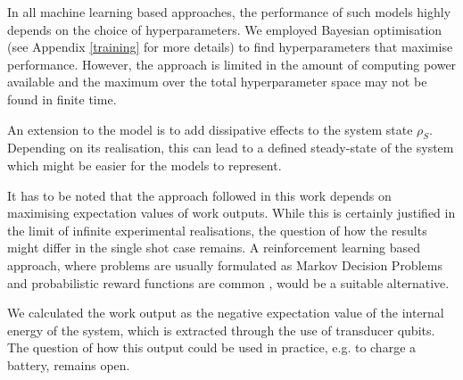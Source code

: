 In all machine learning based approaches, the performance of such models highly depends on the choice of hyperparameters.
We employed Bayesian optimisation (see Appendix \ref{training} for more details) to find hyperparameters that maximise performance.
However, the approach is limited in the amount of computing power available and the maximum over the total hyperparameter space may not be found in finite time.

An extension to the model is to add dissipative effects to the system state $\rho_S$.
Depending on its realisation, this can lead to a defined steady-state of the system which might be easier for the models to represent.

It has to be noted that the approach followed in this work depends on maximising expectation values of work outputs.
While this is certainly justified in the limit of infinite experimental realisations, the question of how the results might differ in the single shot case remains.
A reinforcement learning based approach, where problems are usually formulated as Markov Decision Problems and probabilistic reward functions are common \cite{Sutton1998}, would be a suitable alternative.

We calculated the work output as the negative expectation value of the internal energy of the system, which is extracted through the use of transducer qubits.
The question of how this output could be used in practice, e.g. to charge a battery, remains open.